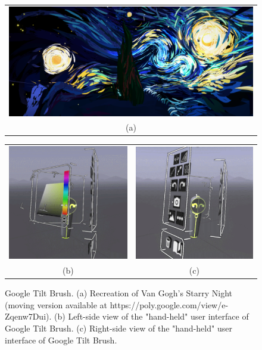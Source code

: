 \begin{figure}[t!]
    \centering
    \setlength{\tabcolsep}{0.0130\linewidth}
    \begin{tabular}{@{}c@{}}
    \includegraphics[width=0.7260\linewidth]{figures/TiltBrush_StarryNight}\\
    (a)
    \end{tabular}
    
    \centering
    \setlength{\tabcolsep}{0.0130\linewidth}
    \begin{tabular}{@{}cc@{}}
   	\includegraphics[width=0.35\linewidth]{figures/Tilt_menu2}&
    \includegraphics[width=0.35\linewidth]{figures/Tilt_menu1}\\
    (b)&(c)\\
    \end{tabular}
    \caption[Google Tilt Brush]{Google Tilt Brush.
    	  \textup{(a)} Recreation of Van Gogh's Starry Night (moving version available at https://poly.google.com/view/e-Zqenw7Dui).
			  \textup{(b)} Left-side view of the "hand-held" user interface of Google Tilt Brush. \textup{(c)} Right-side view of the "hand-held" user interface of Google Tilt Brush.
      \label{fig:tiltart}}
\end{figure}


